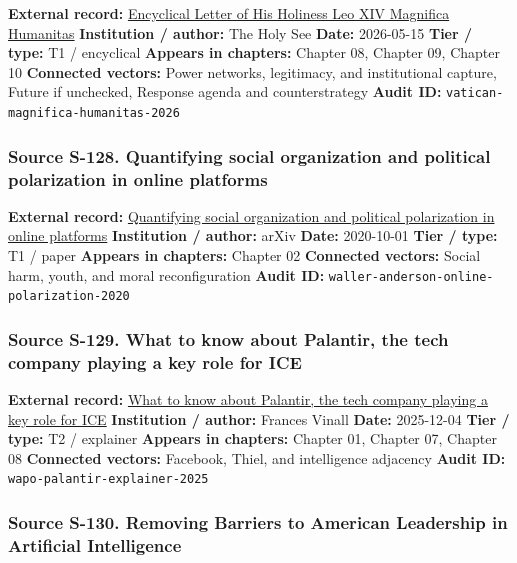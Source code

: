 \documentclass[
  american,
  11pt,
  letterpaper,
]{article}
\begin{document}
\textbf{External record:}
\href{https://www.vatican.va/content/leo-xiv/en/encyclicals/documents/20260515-magnifica-humanitas.html}{Encyclical
Letter of His Holiness Leo XIV Magnifica Humanitas} \textbf{Institution
/ author:} The Holy See \textbf{Date:} 2026-05-15 \textbf{Tier / type:}
T1 / encyclical \textbf{Appears in chapters:} Chapter 08, Chapter 09,
Chapter 10 \textbf{Connected vectors:} Power networks, legitimacy, and
institutional capture, Future if unchecked, Response agenda and
counterstrategy \textbf{Audit ID:}
\texttt{vatican-magnifica-humanitas-2026}

\subsubsection{Source S-128. Quantifying social organization and
political polarization in online
platforms}\label{source-s-128-quantifying-social-organization-and-political-polarization-in-online-platforms}

\textbf{External record:}
\href{https://arxiv.org/abs/2010.00590}{Quantifying social organization
and political polarization in online platforms} \textbf{Institution /
author:} arXiv \textbf{Date:} 2020-10-01 \textbf{Tier / type:} T1 /
paper \textbf{Appears in chapters:} Chapter 02 \textbf{Connected
vectors:} Social harm, youth, and moral reconfiguration \textbf{Audit
ID:} \texttt{waller-anderson-online-polarization-2020}

\subsubsection{Source S-129. What to know about Palantir, the tech
company playing a key role for
ICE}\label{source-s-129-what-to-know-about-palantir-the-tech-company-playing-a-key-role-for-ice}

\textbf{External record:}
\href{https://www.washingtonpost.com/technology/2025/12/04/what-does-palantir-do-explained/}{What
to know about Palantir, the tech company playing a key role for ICE}
\textbf{Institution / author:} Frances Vinall \textbf{Date:} 2025-12-04
\textbf{Tier / type:} T2 / explainer \textbf{Appears in chapters:}
Chapter 01, Chapter 07, Chapter 08 \textbf{Connected vectors:} Facebook,
Thiel, and intelligence adjacency \textbf{Audit ID:}
\texttt{wapo-palantir-explainer-2025}

\subsubsection{Source S-130. Removing Barriers to American Leadership in
Artificial
Intelligence}\label{source-s-130-removing-barriers-to-american-leadership-in-artificial-intelligence}
\end{document}
